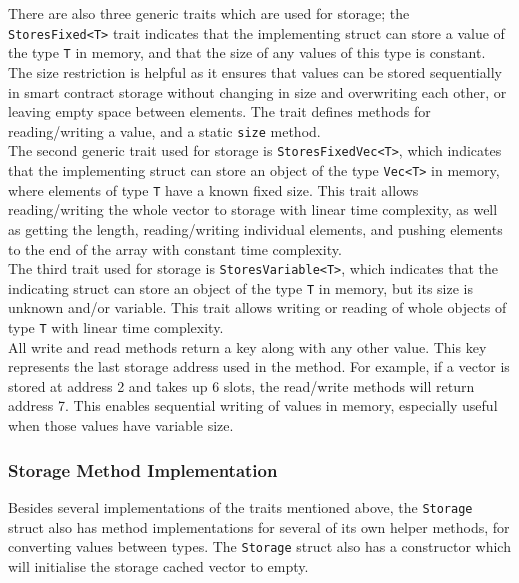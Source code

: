 There are also three generic traits which are used for storage; the \texttt{StoresFixed<T>} trait indicates that the implementing struct can store a value of the type \texttt{T} in memory, and that the size of any values of this type is constant. The size restriction is helpful as it ensures that values can be stored sequentially in smart contract storage without changing in size and overwriting each other, or leaving empty space between elements. The trait defines methods for reading/writing a value, and a static \texttt{size} method. \\

The second generic trait used for storage is \texttt{StoresFixedVec<T>}, which indicates that the implementing struct can store an object of the type \texttt{Vec<T>} in memory, where elements of type \texttt{T} have a known fixed size. This trait allows reading/writing the whole vector to storage with linear time complexity, as well as getting the length, reading/writing individual elements, and pushing elements to the end of the array with constant time complexity. \\

The third trait used for storage is \texttt{StoresVariable<T>}, which indicates that the indicating struct can store an object of the type \texttt{T} in memory, but its size is unknown and/or variable. This trait allows writing or reading of whole objects of type \texttt{T} with linear time complexity. \\

All write and read methods return a key along with any other value. This key represents the last storage address used in the method. For example, if a vector is stored at address 2 and takes up 6 slots, the read/write methods will return address 7. This enables sequential writing of values in memory, especially useful when those values have variable size.


\subsubsection{Storage Method Implementation}

Besides several implementations of the traits mentioned above, the \texttt{Storage} struct also has method implementations for several of its own helper methods, for converting values between types. The \texttt{Storage} struct also has a constructor which will initialise the storage cached vector to empty. \\

